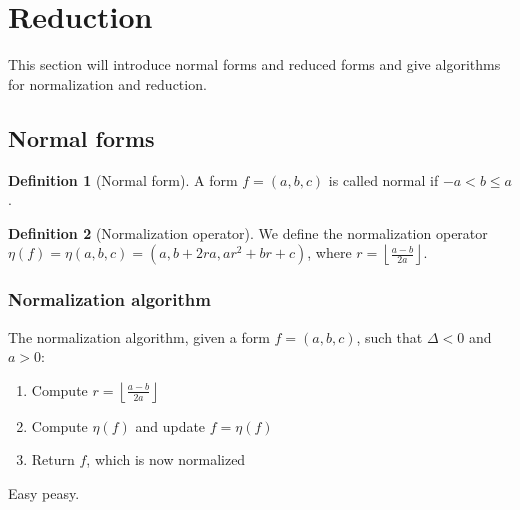 \documentclass{article}
\theoremstyle{definition}
\newtheorem{definition}{Definition}[section]
\theoremstyle{theorem}
\theoremstyle{example}
\theoremstyle{corollary}
\begin{document}
\bigskip








\section{Reduction}

\bigskip

This section will introduce normal forms and reduced forms and give algorithms for normalization and reduction.

\bigskip

\subsection{Normal forms}

\bigskip

\theoremstyle{definition}
\begin{definition}[Normal form]
A form \(f = (a, b, c)\) is called normal if \(-a < b \le a\).
\end{definition}

\bigskip

\theoremstyle{definition}
\begin{definition}[Normalization operator]
We define the normalization operator \(\eta (f) = \eta (a, b, c) = (a, b + 2ra, ar^{2} + br + c)\), where \(r = \left\lfloor \frac{a-b}{2a} \right\rfloor\).
\end{definition}

\bigskip

\subsubsection{Normalization algorithm}

\bigskip

The normalization algorithm, given a form \(f = (a, b, c)\), such that \(\Delta < 0\) and \(a > 0\):
\begin{enumerate}
\item Compute \(r = \left\lfloor \frac{a-b}{2a} \right\rfloor\)
\item Compute \(\eta( f)\) and update \(f = \eta(f)\)
\item Return \(f\), which is now normalized
\end{enumerate}

\bigskip

Easy peasy.

\bigskip
\end{document}

